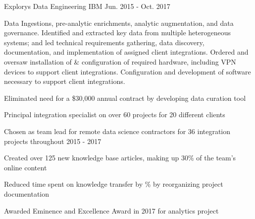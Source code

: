 \begin{cventries}
  \cventry
    {Explorys} %
    {Data Engineering} %
    {IBM} %
    {Jun. 2015 - Oct. 2017} %
    {
      \begin{cvparagraph}
        Data Ingestions, pre-analytic enrichments, analytic augmentation, and data governance.  Identified and extracted key data from multiple heterogeneous systems; and led technical requirements gathering, data discovery, documentation, and implementation of assigned client integrations.  Ordered and oversaw installation of \& configuration of required hardware, including VPN devices to support client integrations.  Configuration and development of software necessary to support client integrations.
      \end{cvparagraph}
      \begin{cvitems} %
        \item {Eliminated need for a \$30,000 annual contract by developing data curation tool}
        \item {Principal integration specialist on over 60 projects for 20 different clients}
        \item {Chosen as team lead for  remote data science contractors for 36 integration projects throughout 2015 - 2017}
        \item {Created over 125 new knowledge base articles, making up 30\% of the team's online content}
        \item {Reduced time spent on knowledge transfer by \% by reorganizing project documentation}
        \item {Awarded Eminence and Excellence Award in 2017 for analytics project}
      \end{cvitems}
    }


\end{cventries}
